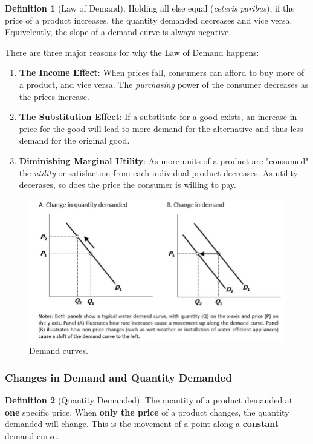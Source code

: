 \documentclass[12pt, a4paper]{article}
\theoremstyle{definition}
\newtheorem{definition}{Definition}
\begin{document}
\begin{definition}[Law of Demand]
    Holding all else equal (\textit{ceteris paribus}), if the price of a product increases, the quantity demanded decreases and vice versa.
    Equivelently, the slope of a demand curve is always negative.
\end{definition}

There are three major reasons for why the Law of Demand happens:
\begin{enumerate}
    \item \textbf{The Income Effect}: When prices fall, consumers can afford to buy more of a product, and vice versa. The \textit{purchasing} power of the consumer decreases as the prices increase.
    \item \textbf{The Substitution Effect}: If a substitute for a good exists, an increase in price for the good will lead to more demand for the alternative and thus less demand for the original good.
    \item \textbf{Diminishing Marginal Utility}: As more units of a product are "consumed" the \textit{utility} or satisfaction from each individual product decreases. As utility decerases, so does the price the consumer is willing to pay.
\end{enumerate}

\begin{figure}[ht] %
    \centering
    \includegraphics[width=1\textwidth]{demand.png}
    \caption{Demand curves.}
    \label{fig:demand}
\end{figure}

\subsubsection{Changes in Demand and Quantity Demanded}
\begin{definition}[Quantity Demanded]
    The quantity of a product demanded at \textbf{one} specific price.
    When \textbf{only the price} of a product changes, the quantity demanded will change.
    This is the movement of a point along a \textbf{constant} demand curve.
\end{definition}
\end{document}
